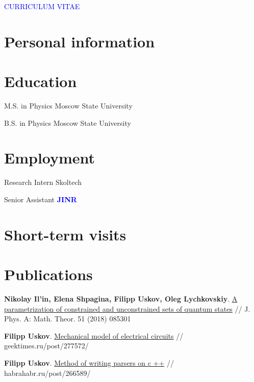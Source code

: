 \documentclass[10pt,a4paper,sans]{moderncv}
\begin{document}

\begin{center}
\textcolor{blue}{\Large CURRICULUM VITAE}
\end{center}

\section{Personal information}

	


\section{Education}


{M.S. in Physics}
{}
{Moscow State University}
{}{}

{B.S. in Physics}
{}
{Moscow State University}
{}{}


\section{Employment}

	{Research Intern}{}
	{Skoltech}{}{}

	{Senior Assistant}{}
	{\textbf{\textcolor{blue}{JINR}}}{}{}

\section{Short-term visits}


\section{Publications}

	{\textbf{Nikolay Il'in, Elena Shpagina, Filipp Uskov, Oleg Lychkovskiy}.
	{\textcolor{blue}{\href{http://iopscience.iop.org/article/10.1088/1751-8121/aaa32d/meta}{A parametrization of constrained and unconstrained sets of quantum states}}} //  J. Phys. A: Math. Theor. 51 (2018) 085301}

	{\textbf{Filipp Uskov}.
	{\textcolor{blue}{\href{https://habr.com/post/372403/}{Mechanical model of electrical circuits}}} //   geektimes.ru/post/277572/}

	{\textbf{Filipp Uskov}.
	{\textcolor{blue}{\href{https://habr.com/post/266589/}{ Method of writing parsers on c ++}}} //    habrahabr.ru/post/266589/}
\end{document}
